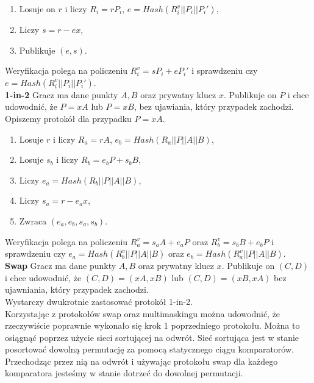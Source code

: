 \documentclass{article}
\begin{document}
\noindent \begin{enumerate}
    \item Losuje on $r$ i liczy $R_i = rP_i$, $e = Hash(R_i^v || P_i || P_i')$,
    \item Liczy $s = r - ex$,
    \item Publikuje $(e,s)$.
\end{enumerate}

\noindent Weryfikacja polega na policzeniu $R_i^v = sP_i + eP_i'$ i sprawdzeniu czy $e = Hash(R_i^v || P_i || P_i')$.
\\


\noindent \textbf{1-in-2} Gracz ma dane punkty $A,B$ oraz prywatny klucz $x$. Publikuje on $P$ i chce udowodnić, że $P = xA$ lub $P=xB$, bez ujawiania, który przypadek zachodzi.
\\

\noindent Opiszemy protokół dla przypadku $P = xA$.
\noindent \begin{enumerate}
    \item Losuje $r$ i liczy $R_a = rA$, $e_b = Hash(R_a || P || A || B)$,
    \item Losuje $s_b$ i liczy $R_b = e_bP + s_bB$,
    \item Liczy $e_a = Hash(R_b || P || A || B)$,
    \item Liczy $s_a = r - e_ax$,
    \item Zwraca $(e_a,e_b,s_a,s_b)$.
\end{enumerate}

\noindent Weryfikacja polega na policzeniu $R_a^v = s_aA + e_aP$ oraz $R_b^v = s_bB + e_bP$ i sprawdzeniu czy $e_a = Hash(R_b^v || P || A || B)$ oraz $e_b = Hash(R_a^v || P || A || B)$.
\\

\noindent \textbf{Swap} Gracz ma dane punkty $A,B$ oraz prywatny klucz $x$. Publikuje on $(C,D)$ i chce udowodnić, że $(C,D) = (xA,xB)$ lub $(C,D) = (xB,xA)$ bez ujawniania, który przypadek zachodzi.
\\

\noindent Wystarczy dwukrotnie zastosować protokół 1-in-2.
\\


Korzystając z protokołów swap oraz multimaskingu można udowodnić, że rzeczywiście poprawnie wykonało się krok 1 poprzedniego protokołu. Można to osiągnąć poprzez użycie sieci sortującej na odwrót. Sieć sortująca jest w stanie posortować dowolną permutację za pomocą statycznego ciągu komparatorów. Przechodząc przez nią na odwrót i używając protokołu swap dla każdego komparatora jesteśmy w stanie dotrzeć do dowolnej permutacji.
\end{document}
